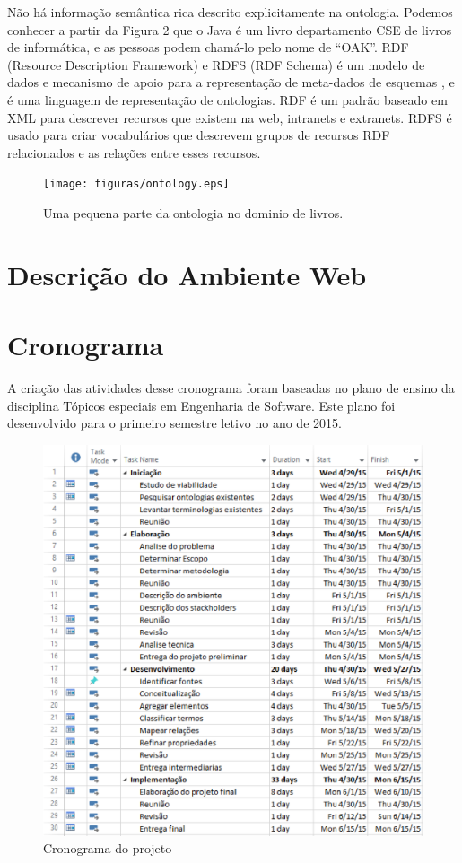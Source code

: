 Não há informação semântica rica descrito explicitamente na ontologia. Podemos conhecer a partir da Figura 2 que o Java é um livro departamento CSE de livros de informática, e as pessoas podem chamá-lo pelo nome de ``OAK''. RDF (Resource Description Framework) e RDFS (RDF Schema) é um modelo de dados e mecanismo de apoio para a representação de meta-dados de esquemas \cite{rdf}, e é uma linguagem de representação de ontologias. RDF é um padrão baseado em XML para descrever recursos que existem na web, intranets e extranets. RDFS é usado para criar vocabulários que descrevem grupos de recursos RDF relacionados e as relações entre esses recursos. 


 \begin{figure}[ht]
	\centering
		\texttt{[image: figuras/ontology.eps]}
	\caption{Uma pequena parte da ontologia no dominio de livros.}
	\label{lanctocalivros}
\end{figure}





\section{Descrição do Ambiente Web}


\section{Cronograma}
A criação das atividades desse cronograma foram baseadas no plano de ensino da disciplina Tópicos especiais em Engenharia de Software. Este plano foi desenvolvido para o primeiro semestre letivo no ano de 2015.

 \begin{figure}[ht]
  \centering
    \includegraphics[keepaspectratio=true,scale=0.5]{figuras/cronograma.eps}
  \caption{Cronograma do projeto}
\end{figure}